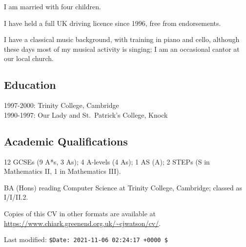 \documentclass[a4paper,12pt]{report}
\begin{document}
    I am married with four children.

    I have held a full UK driving licence since 1996, free from endorsements.

    I have a classical music background, with training in piano and cello,
    although these days most of my musical activity is singing; I am an
    occasional cantor at our local church.

    \subsection*{Education}

    1997-2000: Trinity College, Cambridge \\
    1990-1997: Our Lady and St.\ Patrick's College, Knock

    \subsection*{Academic Qualifications}

    12 GCSEs (9 A*s, 3 As); 4 A-levels (4 As); 1 AS (A); 2 STEPs (S in
    Mathematics II, 1 in Mathematics III).

    BA (Hons) reading Computer Science at Trinity College, Cambridge; classed as
    I/I/II.2.

    \addvspace{1em}

    Copies of this CV in other formats are available at
    \url{https://www.chiark.greenend.org.uk/~cjwatson/cv/}.

    Last modified: \verb'$Date: 2021-11-06 02:24:17 +0000 $'
\end{document}
